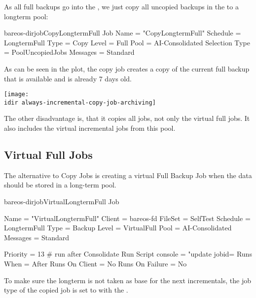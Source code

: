 As all full backups go into the , we just copy all uncopied backups in the  to a longterm pool:

\begin{bareosConfigResource}{bareos-dir}{job}{CopyLongtermFull}
Job {
  Name = "CopyLongtermFull"
  Schedule = LongtermFull
  Type = Copy
  Level = Full
  Pool = AI-Consolidated
  Selection Type = PoolUncopiedJobs
  Messages = Standard
}
\end{bareosConfigResource}

As can be seen in the plot, the copy job creates a copy of the current full backup that is available and is already 7 days old.
\begin{center}
\texttt{[image: \\idir always-incremental-copy-job-archiving]}
\end{center}

The other disadvantage is, that it copies all jobs, not only the virtual full jobs. It also includes the virtual incremental jobs from this pool.


\subsection{Virtual Full Jobs}

The alternative to Copy Jobs is creating a virtual Full Backup Job when the data should be stored in a long-term pool.

\begin{bareosConfigResource}{bareos-dir}{job}{VirtualLongtermFull}
Job {
  Name = "VirtualLongtermFull"
  Client = bareos-fd
  FileSet = SelfTest
  Schedule = LongtermFull
  Type = Backup
  Level = VirtualFull
  Pool = AI-Consolidated
  Messages = Standard

  Priority = 13                 # run after  Consolidate
  Run Script {
        console = "update jobid=%
        Runs When = After
        Runs On Client = No
        Runs On Failure = No
  }
}
\end{bareosConfigResource}


To make sure the longterm  is not taken as base for the next incrementals,
the job type of the copied job is set to 
with the .

